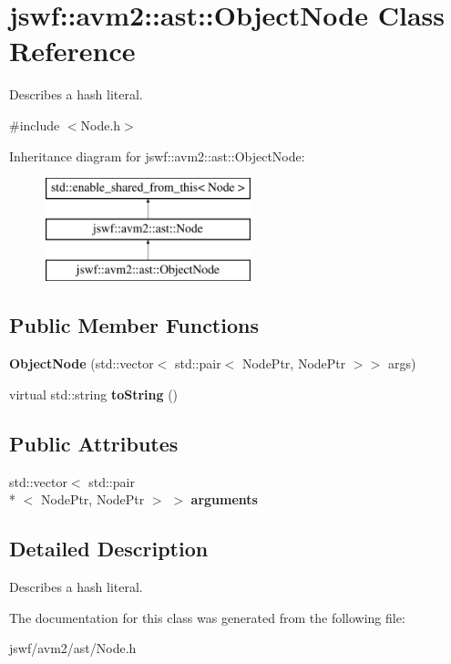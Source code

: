 \hypertarget{classjswf_1_1avm2_1_1ast_1_1_object_node}{\section{jswf\+:\+:avm2\+:\+:ast\+:\+:Object\+Node Class Reference}
\label{classjswf_1_1avm2_1_1ast_1_1_object_node}
}


Describes a hash literal.  




{\ttfamily \#include $<$Node.\+h$>$}

Inheritance diagram for jswf\+:\+:avm2\+:\+:ast\+:\+:Object\+Node\+:\begin{figure}[H]
\begin{center}
\leavevmode
\includegraphics[height=3.000000cm]{classjswf_1_1avm2_1_1ast_1_1_object_node}
\end{center}
\end{figure}
\subsection*{Public Member Functions}
\begin{DoxyCompactItemize}
\item 
\hypertarget{classjswf_1_1avm2_1_1ast_1_1_object_node_a3d228ec79b83650ba4ca669f72d0de32}{{\bfseries Object\+Node} (std\+::vector$<$ std\+::pair$<$ Node\+Ptr, Node\+Ptr $>$$>$ args)}\label{classjswf_1_1avm2_1_1ast_1_1_object_node_a3d228ec79b83650ba4ca669f72d0de32}

\item 
\hypertarget{classjswf_1_1avm2_1_1ast_1_1_object_node_a19a8146db6ae2162cd1c19d4a67c9c34}{virtual std\+::string {\bfseries to\+String} ()}\label{classjswf_1_1avm2_1_1ast_1_1_object_node_a19a8146db6ae2162cd1c19d4a67c9c34}

\end{DoxyCompactItemize}
\subsection*{Public Attributes}
\begin{DoxyCompactItemize}
\item 
\hypertarget{classjswf_1_1avm2_1_1ast_1_1_object_node_a29b0fa79dd6e677e74c16e6a5f7613a0}{std\+::vector$<$ std\+::pair\\*
$<$ Node\+Ptr, Node\+Ptr $>$ $>$ {\bfseries arguments}}\label{classjswf_1_1avm2_1_1ast_1_1_object_node_a29b0fa79dd6e677e74c16e6a5f7613a0}

\end{DoxyCompactItemize}


\subsection{Detailed Description}
Describes a hash literal. 

The documentation for this class was generated from the following file\+:\begin{DoxyCompactItemize}
\item 
jswf/avm2/ast/Node.\+h\end{DoxyCompactItemize}
